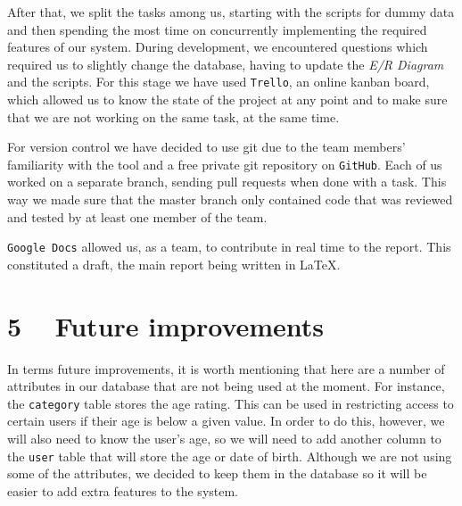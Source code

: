 \documentclass{article}
\begin{document}
\par {After that, we split the tasks among us, starting with the scripts for dummy data and then spending the most time on concurrently implementing the required features of our system. During development, we encountered questions which required us to slightly change the database, having to update the \textsl{E/R Diagram} and the scripts. For this stage we have used \texttt{Trello}, an online kanban board, which allowed us to know the state of the project at any point and to make sure that we are not working on the same task, at the same time.}\\
 
\par {For version control we have decided to use git due to the team members' familiarity with the tool and a free private git repository on \texttt{GitHub}. Each of us worked on a separate branch, sending pull requests when done with a task. This way we made sure that the master branch only contained code that was reviewed and tested by at least one member of the team.}\\

\par {\texttt{Google Docs} allowed us, as a team, to contribute in real time to the report. This constituted a draft, the main report being written in \LaTeX.}


\section{5 ~  Future improvements}
\par {}
\par {In terms future improvements, it is worth mentioning that here are a number of attributes in our database that are not being used at the moment. For instance, the \texttt{category} table stores the age rating. This can be used in restricting access to certain users if their age is below a given value. In order to do this, however, we will also need to know the user's age, so we will need to add another column to the \texttt{user} table that will store the age or date of birth. Although we are not using some of the attributes, we decided to keep them in the database so it will be easier to add extra features to the system. }
\end{document}
